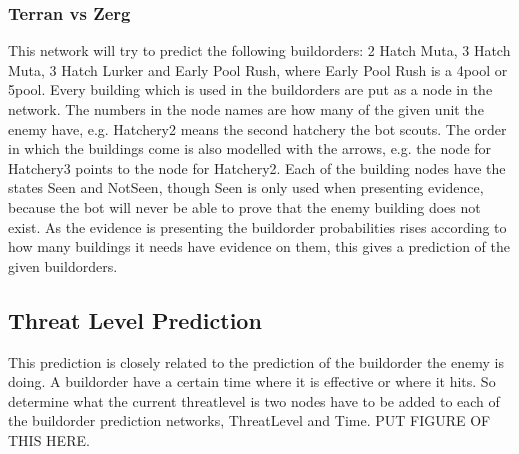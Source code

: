 
\subsubsection{Terran vs Zerg}
	This network will try to predict the following buildorders: 2 Hatch Muta, 3 Hatch Muta, 3 Hatch Lurker and Early Pool Rush, 
	where Early Pool Rush is a 4pool or 5pool. Every building which is used in the buildorders are put as a node in the network. 
	The numbers in the node names are how many of the given unit the enemy have, e.g. Hatchery2 means the second hatchery the bot scouts. 
	The order in which the buildings come is also modelled with the arrows, 
	e.g. the node for Hatchery3 points to the node for Hatchery2. Each of the building nodes have the states Seen and NotSeen, 
	though Seen is only used when presenting evidence, because the bot will never be able to prove that the 
	enemy building does not exist. As the evidence is presenting the buildorder 
	probabilities rises according to how many buildings it needs have evidence on them, this gives a prediction of the given buildorders.

\subsection{Threat Level Prediction}
	This prediction is closely related to the prediction of the buildorder the enemy is doing. A buildorder have a certain time where it is effective 
	or where it hits. So determine what the current threatlevel is two nodes have to be added to each of the buildorder prediction networks, ThreatLevel 
	and Time. PUT FIGURE OF THIS HERE.

	












 

